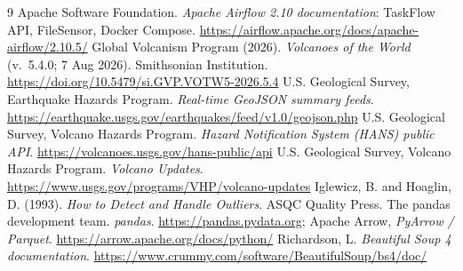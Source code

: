 \documentclass[11pt,a4paper]{article}
\begin{document}
\begin{thebibliography}{9}
 Apache Software Foundation. \emph{Apache Airflow 2.10 documentation}: TaskFlow API, FileSensor, Docker Compose. \url{https://airflow.apache.org/docs/apache-airflow/2.10.5/}
 Global Volcanism Program (2026). \emph{Volcanoes of the World} (v.~5.4.0; 7 Aug 2026). Smithsonian Institution. \url{https://doi.org/10.5479/si.GVP.VOTW5-2026.5.4}
 U.S. Geological Survey, Earthquake Hazards Program. \emph{Real-time GeoJSON summary feeds}. \url{https://earthquake.usgs.gov/earthquakes/feed/v1.0/geojson.php}
 U.S. Geological Survey, Volcano Hazards Program. \emph{Hazard Notification System (HANS) public API}. \url{https://volcanoes.usgs.gov/hans-public/api}
 U.S. Geological Survey, Volcano Hazards Program. \emph{Volcano Updates}. \url{https://www.usgs.gov/programs/VHP/volcano-updates}
 Iglewicz, B. and Hoaglin, D. (1993). \emph{How to Detect and Handle Outliers}. ASQC Quality Press.
 The pandas development team. \emph{pandas}. \url{https://pandas.pydata.org}; Apache Arrow, \emph{PyArrow / Parquet}. \url{https://arrow.apache.org/docs/python/}
 Richardson, L. \emph{Beautiful Soup 4 documentation}. \url{https://www.crummy.com/software/BeautifulSoup/bs4/doc/}
\end{thebibliography}
\end{document}

